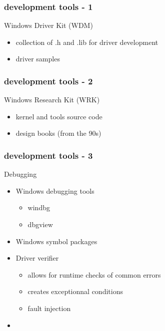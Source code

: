 
\begin{frame}
 \frametitle{development tools - 1}

 Windows Driver Kit (WDM)

 \begin{itemize}
  \item collection of .h and .lib for driver development
  \item driver samples
 \end{itemize}

\end{frame}


\begin{frame}
 \frametitle{development tools - 2}

 Windows Research Kit (WRK)

 \begin{itemize}
  \item kernel and tools source code
  \item design books (from the 90s)
 \end{itemize}

\end{frame}


\begin{frame}
 \frametitle{development tools - 3}

 Debugging

 \begin{itemize}

  \item Windows debugging tools
  \begin{itemize}
   \item windbg 
   \item dbgview
  \end{itemize}

  \item Windows symbol packages

  \item Driver verifier
   \begin{itemize}
    \item allows for runtime checks of common errors
    \item creates exceptionnal conditions
    \item fault injection
   \end{itemize}
  \item

 \end{itemize}

\end{frame}

